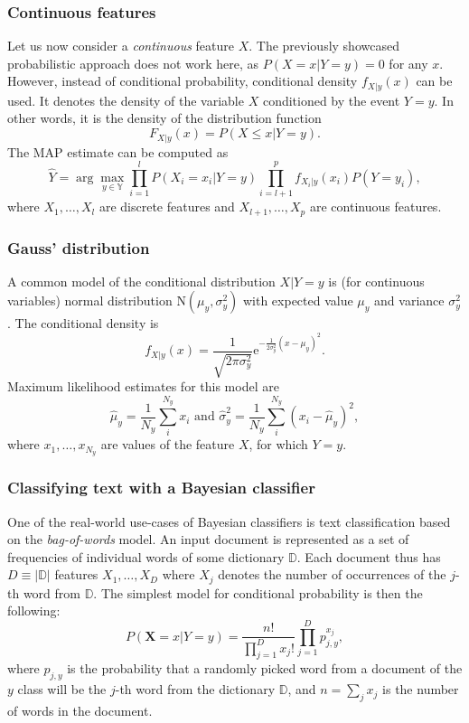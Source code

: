 \documentclass[a4paper]{article}
\begin{document}
	\subsubsection{Continuous features}
	Let us now consider a \textit{continuous} feature $X$. The previously showcased
	probabilistic approach does not work here, as $P(X = x | Y = y) = 0$ for
	any $x$. However, instead of conditional probability, conditional
	density $f_{X | y}(x)$ can be used. It denotes the density of the variable
	$X$ conditioned by the event $Y = y$. In other words, it is the density
	of the distribution function \[
		F_{X | y}(x) = P(X \le x | Y = y)
	.\] The MAP estimate can be computed as \[
		\hat{Y} = \arg \max_{y \in \mathbb{Y}} \prod_{i = 1}^l P(X_i = x_i | Y = y)
		    \prod_{i = l + 1}^p f_{X_i | y}(x_i) P(Y = y_i)
	,\] where $X_1, \ldots, X_l$ are discrete features and $X_{l + 1}, \ldots, X_p$
	are continuous features.

	\subsubsection{Gauss' distribution}
	A common model of the conditional distribution $X|Y = y$ is (for continuous variables)
	normal distribution $\mathrm{N}(\mu_y, \sigma_y^2)$ with expected value $\mu_y$
	and variance $\sigma_y^2$. The conditional density is \[
		f_{X|y}(x)
		 = \frac{1}{\sqrt{2\pi \sigma_y^2}}\mathrm{e}^{-\frac{1}{2\sigma_y^2}(x - \mu_y)^2}
	.\] Maximum likelihood estimates for this model are \[
		\hat{\mu}_y = \frac{1}{N_y}\sum_i^{N_y} x_i
		\text{ and }
		\hat{\sigma}_y^2 = \frac{1}{N_y}\sum_i^{N_y} \left( x_i - \hat{\mu}_y \right)^2
	,\] where $x_1, \ldots, x_{N_y}$ are values of the feature $X$,
	for which $Y = y$.

	\subsubsection{Classifying text with a Bayesian classifier}
	One of the real-world use-cases of Bayesian classifiers is text classification
	based on the \textit{bag-of-words} model. An input document is represented as
	a set of frequencies of individual words of some dictionary $\mathbb{D}$.
	Each document thus has $D \equiv |\mathbb{D}|$ features $X_1, \ldots, X_D$ 
	where $X_j$ denotes the number of occurrences of the $j$-th word from
	$\mathbb{D}$. The simplest model for conditional probability is then the
	following: \[
		P(\boldsymbol{X} = x | Y = y) = \frac{n!}{\prod_{j = 1}^D x_j!} \prod_{j = 1}^D p_{j, y}^{x_j}
	,\] where $p_{j, y}$ is the probability that a randomly picked word from
	a document of the $y$ class will be the $j$-th word from the dictionary
	$\mathbb{D}$, and $n = \sum_j x_j$ is the number of words in the document.
\end{document}
